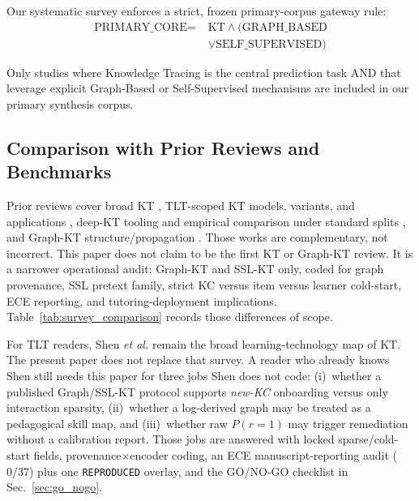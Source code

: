 \documentclass[lettersize,journal]{IEEEtran}
\begin{document}
Our systematic survey enforces a strict, frozen primary-corpus gateway rule:
\begin{equation}
\begin{split}
\text{PRIMARY\_CORE} = \; & \text{KT} \land (\text{GRAPH\_BASED} \\
& \lor \text{SELF\_SUPERVISED})
\end{split}
\end{equation}

Only studies where Knowledge Tracing is the central prediction task AND that leverage explicit Graph-Based or Self-Supervised mechanisms are included in our primary synthesis corpus.

\subsection{Comparison with Prior Reviews and Benchmarks}
Prior reviews cover broad KT \cite{Abdelrahman_Survey_2023}, TLT-scoped KT models, variants, and applications \cite{Shen_KTSurvey_2024}, deep-KT tooling and empirical comparison under standard splits \cite{Liu_pyKT_2022,Liu_DLKT_2025}, and Graph-KT structure/propagation \cite{Xu_GbKT_2026}. Those works are complementary, not incorrect. This paper does not claim to be the first KT or Graph-KT review. It is a narrower operational audit: Graph-KT and SSL-KT only, coded for graph provenance, SSL pretext family, strict KC versus item versus learner cold-start, ECE reporting, and tutoring-deployment implications. Table~\ref{tab:survey_comparison} records those differences of scope.

For TLT readers, Shen \textit{et al.} remain the broad learning-technology map of KT. The present paper does not replace that survey. A reader who already knows Shen still needs this paper for three jobs Shen does not code: (i)~whether a published Graph/SSL-KT protocol supports \emph{new-KC} onboarding versus only interaction sparsity, (ii)~whether a log-derived graph may be treated as a pedagogical skill map, and (iii)~whether raw $P(r=1)$ may trigger remediation without a calibration report. Those jobs are answered with locked sparse/cold-start fields, provenance$\times$encoder coding, an ECE manuscript-reporting audit ($0/37$) plus one \texttt{REPRODUCED} overlay, and the GO/NO-GO checklist in Sec.~\ref{sec:go_nogo}.
\end{document}
